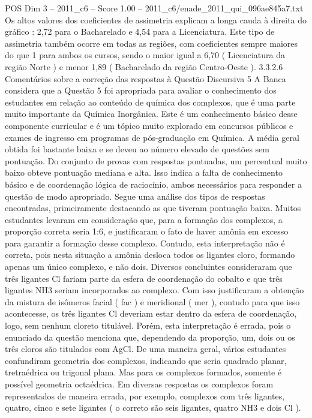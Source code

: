\begin{textsample}{POS Dim 3 – 2011\_c6 – Score 1.00 – 2011\_c6/enade\_2011\_qui\_096ae845a7.txt}
Os altos valores dos coeficientes de assimetria explicam a longa cauda à direita do gráfico : 2,72 para o Bacharelado e 4,54 para a Licenciatura.
Este tipo de assimetria também ocorre em todas as regiões, com coeficientes sempre maiores do que 1 para ambos os cursos, sendo o maior igual a 6,70 ( Licenciatura da região Norte ) e menor 1,89 ( Bacharelado da região Centro-Oeste ). 3.3.2.6 Comentários sobre a correção das respostas à Questão Discursiva 5 A Banca considera que a Questão 5 foi apropriada para avaliar o conhecimento dos estudantes em relação ao conteúdo de química dos complexos, que é uma parte muito importante da Química Inorgânica.
Este é um conhecimento básico desse componente curricular e é um tópico muito explorado em concursos públicos e exames de ingresso em programas de pós-graduação em Química.
A média geral obtida foi bastante baixa e se deveu ao número elevado de questões sem pontuação.
Do conjunto de provas com respostas pontuadas, um percentual muito baixo obteve pontuação mediana e alta.
Isso indica a falta de conhecimento básico e de coordenação lógica de raciocínio, ambos necessários para responder a questão de modo apropriado.
Segue uma análise dos tipos de respostas encontradas, primeiramente destacando as que tiveram pontuação baixa.
Muitos estudantes levaram em consideração que, para a formação dos complexos, a proporção correta seria 1:6, e justificaram o fato de haver amônia em excesso para garantir a formação desse complexo.
Contudo, esta interpretação não é correta, pois nesta situação a amônia desloca todos os ligantes cloro, formando apenas um único complexo, e não dois.
Diversos concluintes consideraram que três ligantes Cl fariam parte da esfera de coordenação do cobalto e que três ligantes NH3 seriam incorporados ao complexo.
Com isso justificaram a obtenção da mistura de isômeros facial ( fac ) e meridional ( mer ), contudo para que isso acontecesse, os três ligantes Cl deveriam estar dentro da esfera de coordenação, logo, sem nenhum cloreto titulável.
Porém, esta interpretação é errada, pois o enunciado da questão menciona que, dependendo da proporção, um, dois ou os três cloros são titulados com AgCl.
De uma maneira geral, vários estudantes confundiram geometria dos complexos, indicando que seria quadrado planar, tretraédrica ou trigonal plana.
Mas para os complexos formados, somente é possível geometria octaédrica.
Em diversas respostas os complexos foram representados de maneira errada, por exemplo, complexos com três ligantes, quatro, cinco e sete ligantes ( o correto são seis ligantes, quatro NH3 e dois Cl ).

\end{textsample}
